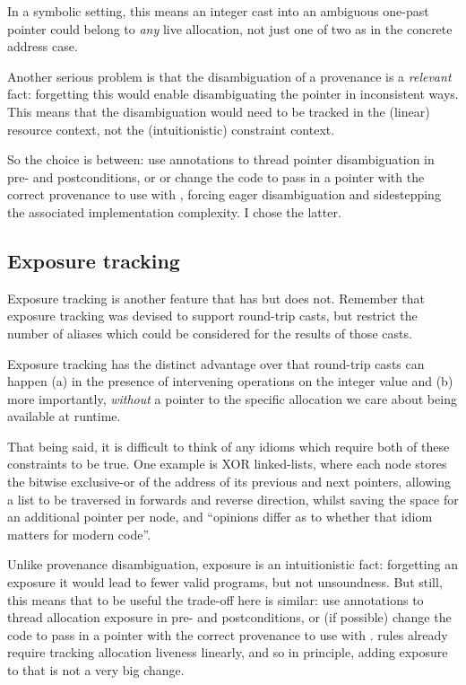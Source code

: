 In a symbolic setting, this means an integer cast into an ambiguous one-past
pointer could belong to \emph{any} live allocation, not just one of two as in
the concrete address case.

Another serious problem is that the disambiguation of a provenance is a
\emph{relevant} fact: forgetting this would enable disambiguating the pointer
in inconsistent ways. This means that the disambiguation would need to be
tracked in the (linear) resource context, not the (intuitionistic) constraint
context.

So the choice is between: use annotations to thread pointer disambiguation in
pre- and postconditions, or or change the code to pass in a pointer with the
correct provenance to use with , forcing eager
disambiguation and sidestepping the associated implementation complexity. I
chose the latter.

\subsection{Exposure tracking}

Exposure tracking is another feature that  has but 
does not. Remember that exposure tracking was devised to support round-trip
casts, but restrict the number of aliases which could be considered for the
results of those casts.

Exposure tracking has the distinct advantage over  that round-trip
casts can happen (a) in the presence of intervening operations on the integer
value and (b) more importantly, \emph{without} a pointer to the specific
allocation we care about being available at runtime.

That being said, it is difficult to think of any idioms which require both of
these constraints to be true. One example is XOR linked-lists, where each node
stores the bitwise exclusive-or of the address of its previous and next
pointers, allowing a list to be traversed in forwards and reverse direction,
whilst saving the space for an additional pointer per node, and ``opinions
differ as to whether that idiom matters for modern
code''.

Unlike provenance disambiguation, exposure is an intuitionistic fact:
forgetting an exposure it would lead to fewer valid programs, but not
unsoundness. But still, this means that to be useful the trade-off here is
similar: use annotations to thread allocation exposure in pre- and
postconditions, or (if possible) change the code to pass in a pointer with the
correct provenance to use with .  rules
already require tracking allocation liveness linearly, and so in principle,
adding exposure to that is not a very big change.

